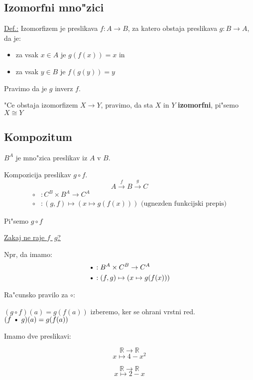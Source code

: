\subsection{Izomorfni mno"zici}
\underline{Def.:} Izomorfizem je preslikava \(f: A \rightarrow B\), za katero obstaja preslikava \(g: B \rightarrow A\), da je:
\begin{itemize}
	\item za vsak \(x \in A\) je \(g(f(x)) = x\) in
	\item za vsak \(y \in B\) je \(f(g(y)) = y\)
\end{itemize}

Pravimo da je \(g\) inverz \(f\).

"Ce obstaja izomorfizem \(X \rightarrow Y\), pravimo, da sta \(X\) in \(Y\) \textbf{izomorfni}, pi"semo \(X \cong Y\)

\subsection{Kompozitum}
\(B^A\) je mno"zica preslikav iz \(A\) v \(B\).

Kompozicija preslikav \(g \circ f\).
\[A \stackrel{f}{\rightarrow} B \stackrel{g}{\rightarrow} C\]
\begin{align*}
	\circ&: C^B \times B^A \rightarrow C^A\\
	\circ&: (g, f) \mapsto (x \mapsto g(f(x))) \text{ (ugnezden funkcijski prepis)}
\end{align*}

Pi"semo \(g \circ f\)

\underline{Zakaj ne raje \(f\) \textbullet \(\ g\)?}

Npr, da imamo:
\begin{align*}
	\text{\textbullet}&: B^A \times C^B \rightarrow C^A\\
	\text{\textbullet}&: (f, g) \mapsto (x \mapsto g(f(x)))
\end{align*}

Ra"cunsko pravilo za \(\circ\):

\((g \circ f)(a) = g(f(a))\) \checkmark izberemo, ker se ohrani vrstni red.\\
\((f \text{ \textbullet }\ g)(a) = g(f(a))\)

Imamo dve preslikavi:
\begin{multicols}{2}
	\[\mathbb{R} \rightarrow \mathbb{R}\]
	\[x \mapsto 4 - x^2\]
	
	\columnbreak
	\[\mathbb{R} \rightarrow \mathbb{R}\]
	\[x \mapsto 2 - x\]
\end{multicols}

